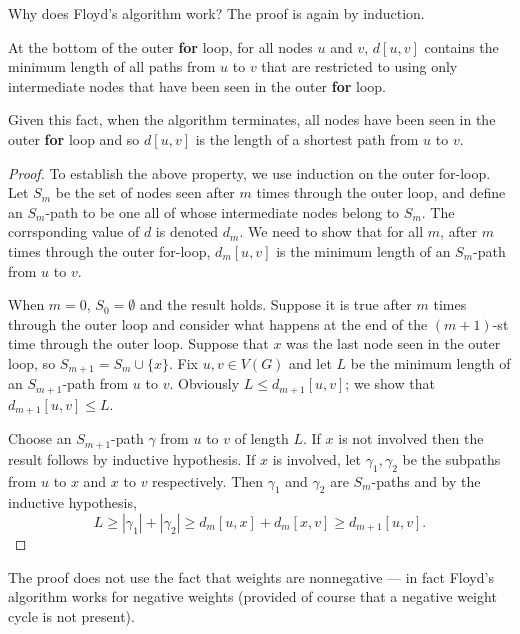 Why does Floyd's algorithm work? The proof is again by induction.

\begin{Theorem}
\label{thm:floyd}
At the bottom of the outer \textbf{for} loop, for all nodes $u$ and $v$,
$d[u,v]$ contains the minimum length of all paths from $u$ to $v$ that
are restricted to using only intermediate nodes that have been seen in
the outer \textbf{for} loop. 
\end{Theorem}

\begin{note}
Given this fact, when the algorithm terminates, all nodes have been seen
in the outer \textbf{for} loop and so $d[u,v]$ is the length of a
shortest path from $u$ to $v$.
\end{note}

\begin{proof}
To establish the above property, we use induction on the outer for-loop.
Let $S_m$ be the set of nodes seen after $m$ times through the
outer loop, and define an $S_m$-path  to be one all of whose
intermediate nodes belong to $S_m$. The corrsponding value of $d$ is denoted $d_m$. We need to show that for all $m$, after $m$ times through the outer for-loop, $d_m[u,v]$ is the minimum length of an $S_m$-path from $u$ to $v$. 

When $m=0$, $S_0 = \emptyset$ and the result holds. Suppose
it is true after $m$ times through the outer loop and consider what
happens at the end of the $(m+1)$-st time through the outer loop.
Suppose that $x$ was the last node seen in the outer loop, so $S_{m+1}=
S_m \cup \{x\}$. Fix $u, v\in V(G)$ and let $L$ be the minimum length of
an $S_{m+1}$-path from $u$ to $v$. Obviously $L \leq d_{m+1}[u,v]$; we
show that $d_{m+1}[u,v] \leq L$. 

Choose an $S_{m+1}$-path $\gamma$ from $u$ to $v$ of length $L$. If $x$
is not involved then the result follows by inductive hypothesis. If $x$
is involved, let $\gamma_1, \gamma_2$ be the subpaths from $u$ to $x$
and $x$ to $v$ respectively. Then $\gamma_1$ and $\gamma_2$ are
$S_m$-paths and by the inductive hypothesis, $$L \geq |\gamma_1| +
|\gamma_2| \geq d_m[u,x] + d_m[x,v] \geq d_{m+1}[u,v].$$

\end{proof}

The proof does not use the fact that weights are nonnegative --- in
fact Floyd's algorithm works for negative weights (provided of course
that a negative weight cycle is not present).


